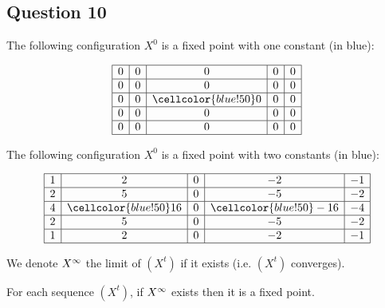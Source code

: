 
\subsection*{Question 10}
 
\begin{ex}
  The following configuration $X^0$ is a fixed point with one constant (in blue):
  
  \[\begin{array}{ | c | c | c | c | c |} \hline
    0 & 0 & 0 & 0 & 0\\ \hline
    0 & 0 & 0 & 0 & 0\\ \hline
    0 & 0 & \cellcolor{blue!50} 0 & 0 & 0\\ \hline
    0 & 0 & 0 & 0 & 0\\ \hline
    0 & 0 & 0 & 0 & 0\\ \hline
  \end{array}\]
\end{ex}

\begin{ex}
  The following configuration $X^0$ is a fixed point with two constants (in blue):
  
  \[\begin{array}{ | c | c | c | c | c |} \hline
    1 & 2 & 0 & -2 & -1\\ \hline
    2 & 5 & 0 & -5 & -2\\ \hline
    4 & \cellcolor{blue!50} 16 & 0 & \cellcolor{blue!50}  -16 & -4\\ \hline
    2 & 5 & 0 & -5 & -2\\ \hline
    1 & 2 & 0 & -2 & -1\\ \hline
  \end{array}\]
\end{ex}


\begin{defi}
  We denote $X^{\infty}$ the limit of $(X^t)$ if it exists (i.e. $(X^t)$ converges).
\end{defi}

\begin{lemma}
 \label{fix}
 For each sequence $(X^t)$, if $X^{\infty}$ exists then it is a fixed point.
\end{lemma}

